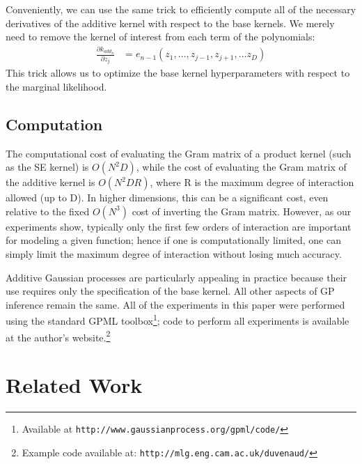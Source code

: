 Conveniently, we can use the same trick to efficiently compute all of the necessary derivatives of the additive kernel with respect to the base kernels.  We merely need to remove the kernel of interest from each term of the polynomials:
\begin{align}
\frac{\partial k_{add_n}}{\partial z_j} & = e_{n-1}(z_1,\dots,z_{j-1},z_{j+1}, \dots z_D)
\end{align}
This trick allows us to optimize the base kernel hyperparameters with respect to the marginal likelihood.

\subsection{Computation}
The computational cost of evaluating the Gram matrix of a product kernel (such as the SE kernel) is $O(N^2D)$, while the cost of evaluating the Gram matrix of the additive kernel is $O(N^2DR)$, where R is the maximum degree of interaction allowed (up to D).  In higher dimensions, this can be a significant cost, even relative to the fixed $O(N^3)$ cost of inverting the Gram matrix.
%
However, as our experiments show, typically only the first few orders of interaction are important for modeling a given function; hence if one is computationally limited, one can simply limit the maximum degree of interaction without losing much accuracy.

Additive Gaussian processes are particularly appealing in practice because their use requires only the specification of the base kernel.  All other aspects of GP inference remain the same.  All of the experiments in this paper were performed using the standard GPML toolbox\footnote{Available at \texttt{http://www.gaussianprocess.org/gpml/code/}}; code to perform all experiments is available at the author's website.\footnote{Example code available at: \texttt{http://mlg.eng.cam.ac.uk/duvenaud/}}


\section{Related Work}


